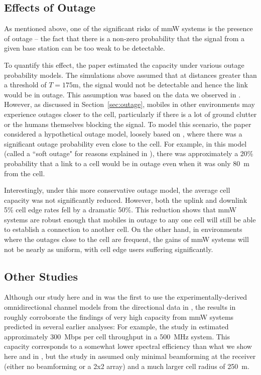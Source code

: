 \documentclass[journal]{IEEEtran}
\begin{document}
\subsection{Effects of Outage}

As mentioned above, one of the significant risks of mmW systems
is the presence of outage -- the fact that there is a non-zero probability
that the signal from a given base station can be too weak to be detectable.

To quantify this effect, the paper \cite{AkLiuRanRapEr:13-arxiv}
estimated the capacity under various outage probability models.
The simulations above assumed that at distances greater than a threshold of
$T=175$m, the signal would not be detectable and hence the link
would be in outage.  This assumption was based on the data we observed in
\cite{rappaportmillimeter,ben2011millimeter,Rappaport:12-28G,Rappaport:28NYCPenetrationLoss,Samimi:AoAD,Nie72G-PIMRC:13,Rappaport:13-BBmmW}.
However, as discussed in Section~\ref{sec:outage}, mobiles in
other environments may experience outages closer to the cell,
particularly if there is a lot of ground clutter or the humans themselves
blocking the signal.
To model this scenario, the paper \cite{AkLiuRanRapEr:13-arxiv}
considered a hypothetical outage model, loosely based on
 \cite{3GPP36.814},
 where there was a significant outage probability even close to the cell.
For example, in this model (called a ``soft outage" for reasons explained in
\cite{AkLiuRanRapEr:13-arxiv}), there was approximately a 20\% probability
that a link to a cell would be in outage even when it was only 80~m from the cell.

Interestingly, under this more conservative outage model, the average cell
capacity was not significantly reduced.  However, both the uplink and downlink
5\% cell edge rates fell by a dramatic 50\%.  This reduction shows that mmW systems are robust enough
that mobiles in outage to any one cell will still be able
to establish a connection to another cell.  On the other hand, in environments
where the outages close to the cell are frequent, the gains of mmW systems
will not be nearly as uniform, with cell edge users suffering significantly.

\subsection{Other Studies}
Although our study here and in \cite{AkLiuRanRapEr:13-arxiv}
was the first to use
the experimentally-derived omnidirectional channel models from the
directional data in
\cite{rappaportmillimeter}, the results in
\cite{AkLiuRanRapEr:13-arxiv} roughly
corroborate the findings of very high capacity from mmW systems
predicted in several earlier analyses:
For example, the study in \cite{KhanPi:11} estimated approximately 300~Mbps per cell throughput
in a 500~MHz system.  This capacity corresponds to
a somewhat lower spectral efficiency than what we show here and in
\cite{AkLiuRanRapEr:13-arxiv},
but  the study in \cite{KhanPi:11} assumed only minimal beamforming at the receiver
(either no beamforming or a 2x2 array) and a much larger cell radius of 250~m.
\end{document}
